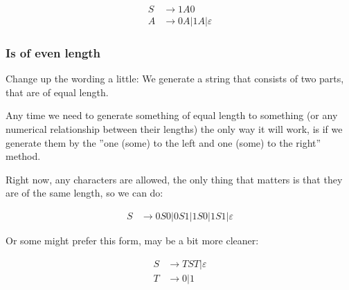 \begin{align*}
S &\rightarrow 1A0\\
A &\rightarrow 0A|1A|\varepsilon
\end{align*}

\subsubsection{Is of even length}

Change up the wording a little: We generate a string that consists of two parts, that are of equal length.

Any time we need to generate something of equal length to something (or any numerical relationship between their lengths) the only way it will work, is if we generate them by the ''one (some) to the left and one (some) to the right'' method.

Right now, any characters are allowed, the only thing that matters is that they are of the same length, so we can do:

\begin{align*}
S &\rightarrow 0S0|0S1|1S0|1S1|\varepsilon
\end{align*}

Or some might prefer this form, may be a bit more cleaner:

\begin{align*}
S &\rightarrow TST|\varepsilon\\
T &\rightarrow 0|1
\end{align*}
